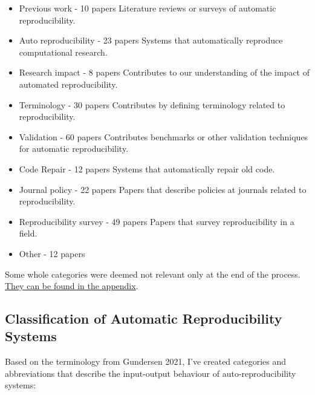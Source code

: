\documentclass[8pt,a4paper]{article}
\begin{document}
\begin{itemize}
    \item Previous work - 10 papers \subitem Literature reviews or surveys of automatic reproducibility.
    \item Auto reproducibility - 23 papers \subitem Systems that automatically reproduce computational research.
    \item Research impact - 8 papers \subitem Contributes to our understanding of the impact of automated reproducibility.
    \item Terminology - 30 papers \subitem Contributes by defining terminology related to reproducibility.
    \item Validation - 60 papers \subitem Contributes benchmarks or other validation techniques for automatic reproducibility.
    \item Code Repair - 12 papers \subitem Systems that automatically repair old code.
    \item Journal policy - 22 papers \subitem Papers that describe policies at journals related to reproducibility.
    \item Reproducibility survey - 49 papers \subitem Papers that survey reproducibility in a field.
    \item Other - 12 papers
\end{itemize}

Some whole categories were deemed not relevant only at the end of the process. \hyperref[sec:notrelevantcategories]{They can be found in the appendix}.

\subsection{Classification of Automatic Reproducibility Systems}
Based on the terminology from Gundersen 2021\cite{gundersen2021}, 
I've created categories and abbreviations that describe the input-output behaviour of auto-reproducibility systems:
\end{document}
